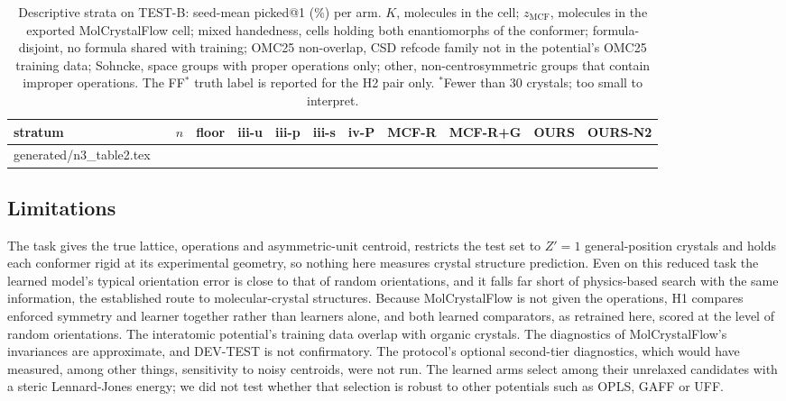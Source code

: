 \documentclass[journal=acsodf,manuscript=article]{achemso}
\makeatletter
\newcommand{\inputrows}[1]{\@@input #1 }
\makeatother
\begin{document}
\begin{table}
\caption{Descriptive strata on TEST-B: seed-mean picked@1 (\%) per arm. $K$, molecules in
the cell; $z_\mathrm{MCF}$, molecules in the exported MolCrystalFlow cell; mixed
handedness, cells holding both enantiomorphs of the conformer; formula-disjoint, no formula
shared with training; OMC25 non-overlap, CSD refcode family not in the potential's OMC25
training data; Sohncke, space groups with proper operations only; other, non-centrosymmetric
groups that contain improper operations. The FF$^\ast$
truth label is reported for the H2 pair only. $^{*}$Fewer than 30 crystals; too small to
interpret.}
\label{tab:strata}
\centering
\small
\setlength{\tabcolsep}{3pt}
\begin{tabular}{llrccccccccc}
\toprule
stratum & & $n$ & floor & iii-u & iii-p & iii-s & iv-P & MCF-R & MCF-R+G & OURS & OURS-N2 \\
\midrule
\inputrows{generated/n3_table2.tex}
\bottomrule
\end{tabular}
\end{table}

\subsection{Limitations}
The task gives the true lattice, operations and asymmetric-unit centroid, restricts the test
set to $Z'=1$ general-position crystals and holds each conformer rigid at its experimental
geometry, so nothing here measures crystal structure prediction. Even on this reduced task
the learned model's typical orientation error is close to that of random orientations, and
it falls far short of physics-based search with the same information, the established route
to molecular-crystal structures\cite{price2023blindtest7}. Because MolCrystalFlow is not
given the operations, H1 compares enforced symmetry and learner together rather than
learners alone, and both learned comparators, as retrained here, scored at the level of
random orientations. The interatomic potential's training data overlap with organic
crystals. The diagnostics of MolCrystalFlow's invariances are approximate, and DEV-TEST is
not confirmatory. The protocol's optional second-tier diagnostics, which would have
measured, among other things, sensitivity to noisy centroids, were not run. The learned arms select
among their unrelaxed candidates with a steric Lennard-Jones energy; we did not test whether
that selection is robust to other potentials such as OPLS, GAFF or UFF.
\end{document}
